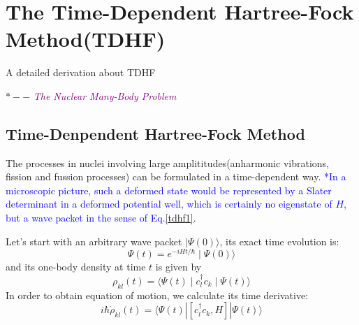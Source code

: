 \chapter{The Time-Dependent Hartree-Fock Method(TDHF)}

\begin{introduction}
  \item A detailed derivation about TDHF
\end{introduction}
  $\ast -- $ \textcolor{purple}{\textit{The Nuclear Many-Body Problem}}

  \section{Time-Denpendent Hartree-Fock Method}
  The processes in nuclei involving large amplititudes(anharmonic vibrations, fission and fussion processes) can be formulated in a time-dependent way.  \textcolor{blue}{*In a microscopic picture, such a deformed state would be represented by a Slater determinant in a deformed potential well, which is certainly no eigenstate of $H$, but a wave packet in the sense of Eq.\eqref{tdhf1}}.

  Let's start with an arbitrary wave packet $\mid\Psi(0)\rangle$, its exact time evolution is:
  \begin{equation}
    \Psi(t) = e^{-iHt/\hbar}\mid \Psi(0)\rangle \label{tdhf1} 
  \end{equation}
  and its one-body density at time $t$ is given by
  \begin{equation}
    \rho_{kl}(t) = \langle \Psi(t) \mid c_l^\dagger c_k \mid \Psi(t) \rangle  \label{tdhf2}
  \end{equation}
  In order to obtain equation of motion, we calculate its time derivative:
  \begin{equation}
    i\hbar\dot{\rho}_{kl}(t) = \langle \Psi(t) | [c_l^\dagger c_k, H] | \Psi(t) \rangle \label{tdhf3}
  \end{equation}

